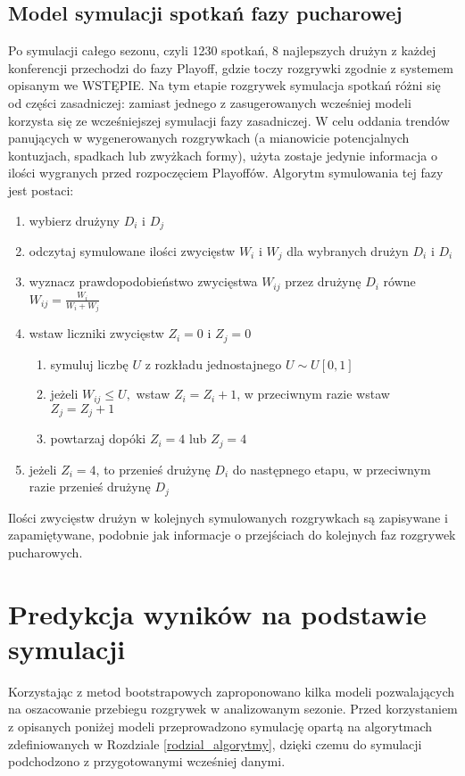 \documentclass[inzynierska]{pwr_wmat_praca_dyplomowa}
\theoremstyle{plain}
\numberwithin{theorem}{chapter}
\theoremstyle{definition}
\numberwithin{theorem}{chapter}
\begin{document}
\subsection{Model symulacji spotkań fazy pucharowej}
Po symulacji całego sezonu, czyli 1230 spotkań, 8 najlepszych drużyn z każdej konferencji przechodzi do fazy Playoff, gdzie toczy rozgrywki zgodnie z systemem opisanym we WSTĘPIE. Na tym etapie rozgrywek symulacja spotkań różni się od części zasadniczej: zamiast jednego z zasugerowanych wcześniej modeli korzysta się ze wcześniejszej symulacji fazy zasadniczej. W celu oddania trendów panujących w wygenerowanych rozgrywkach (a mianowicie potencjalnych kontuzjach, spadkach lub zwyżkach formy), użyta zostaje jedynie informacja o ilości wygranych przed rozpoczęciem Playoffów. Algorytm symulowania tej fazy jest postaci:
\begin{enumerate}
	\item wybierz drużyny $D_i$ i $D_j$
	\item odczytaj symulowane ilości zwycięstw $W_i$ i $W_j$ dla wybranych drużyn $D_i$ i $D_i$
	\item wyznacz prawdopodobieństwo zwycięstwa $W_{ij}$ przez drużynę  $D_i$ równe $W_{ij}=\frac{W_i}{W_i + W_j}$ 
	\item wstaw liczniki zwycięstw $Z_i=0$ i $Z_j=0$ 
		\begin{enumerate}
			\item symuluj liczbę $U$ z rozkładu jednostajnego $U\sim U[0,1]$ 
			\item jeżeli $W_{ij} \leq U,$ wstaw $Z_i=Z_i+1$, w przeciwnym razie wstaw $Z_j=Z_j+1$
			\item powtarzaj dopóki  $Z_i=4$ lub $Z_j=4$
		\end{enumerate}
	\item jeżeli $Z_i=4$, to przenieś drużynę $D_i$ do następnego etapu, w przeciwnym razie przenieś drużynę $D_j$
\end{enumerate} 

Ilości zwycięstw drużyn w kolejnych symulowanych rozgrywkach są zapisywane i zapamiętywane, podobnie jak informacje o przejściach do kolejnych faz rozgrywek pucharowych. 

\section{Predykcja wyników na podstawie symulacji}
Korzystając z metod bootstrapowych zaproponowano kilka modeli pozwalających na oszacowanie przebiegu rozgrywek w analizowanym sezonie.
Przed korzystaniem z opisanych poniżej modeli przeprowadzono symulację opartą na algorytmach zdefiniowanych w Rozdziale \ref{rodzial_algorytmy}, dzięki czemu do symulacji podchodzono z przygotowanymi wcześniej danymi.
\end{document}
